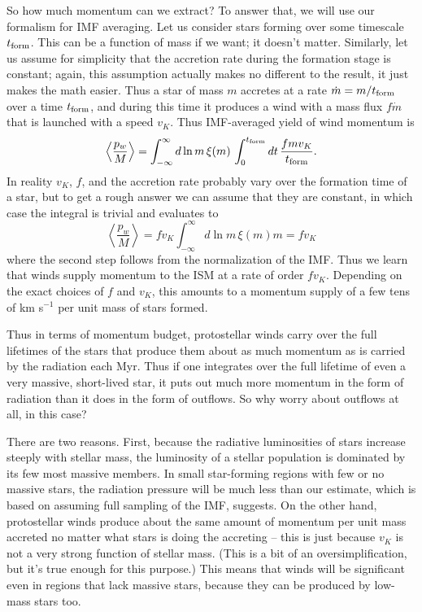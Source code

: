 So how much momentum can we extract? To answer that, we will use our formalism for IMF averaging. Let us consider stars forming over some timescale $t_{\rm form}$. This can be a function of mass if we want; it doesn't matter. Similarly, let us assume for simplicity that the accretion rate during the formation stage is constant; again, this assumption actually makes no different to the result, it just makes the math easier. Thus a star of mass $m$ accretes at a rate $\dot{m} = m/t_{\rm form}$ over a time $t_{\rm form}$, and during this time it produces a wind with a mass flux $f \dot{m}$ that is launched with a speed $v_K$. Thus IMF-averaged yield of wind momentum is
\begin{equation}
\left\langle\frac{p_w}{M}\right\rangle = \int_{-\infty}^{\infty} d\ln m \, \xi(m) \, \int_0^{t_{\rm form}} dt \, \frac{f m v_K}{t_{\rm form}}.
\end{equation}
In reality $v_K$, $f$, and the accretion rate probably vary over the formation time of a star, but to get a rough answer we can assume that they are constant, in which case the integral is trivial and evaluates to
\begin{equation}
\left\langle\frac{p_w}{M}\right\rangle =  f v_K \int_{-\infty}^{\infty} d\ln m \, \xi(m) m = f v_K
\end{equation}
where the second step follows from the normalization of the IMF. Thus we learn that winds supply momentum to the ISM at a rate of order $f v_K$. Depending on the exact choices of $f$ and $v_K$, this amounts to a momentum supply of a few tens of km s$^{-1}$ per unit mass of stars formed.

Thus in terms of momentum budget, protostellar winds carry over the full lifetimes of the stars that produce them about as much momentum as is carried by the radiation each Myr. Thus if one integrates over the full lifetime of even a very massive, short-lived star, it puts out much more momentum in the form of radiation than it does in the form of outflows. So why worry about outflows at all, in this case?

There are two reasons. First, because the radiative luminosities of stars increase steeply with stellar mass, the luminosity of a stellar population is dominated by its few most massive members. In small star-forming regions with few or no massive stars, the radiation pressure will be much less than our estimate, which is based on assuming full sampling of the IMF, suggests. On the other hand, protostellar winds produce about the same amount of momentum per unit mass accreted no matter what stars is doing the accreting -- this is just because $v_K$ is not a very strong function of stellar mass. (This is a bit of an oversimplification, but it's true enough for this purpose.) This means that winds will be significant even in regions that lack massive stars, because they can be produced by low-mass stars too.

